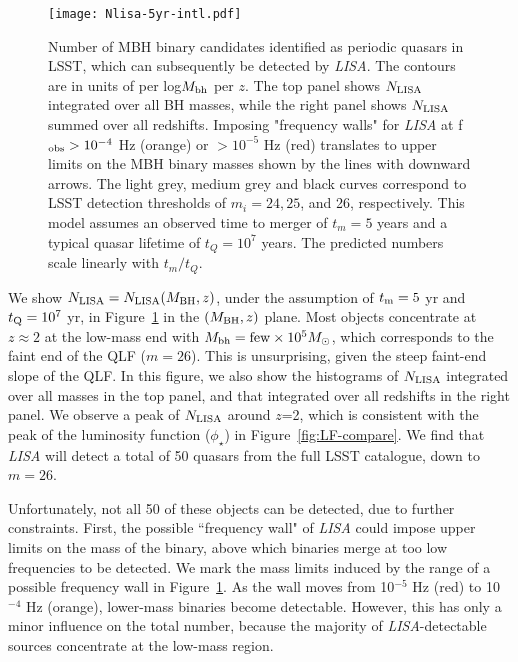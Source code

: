 \documentclass[fleqn,usenatbib]{mnras}
\begin{document}
\begin{figure}
    \centering
    \texttt{[image: Nlisa-5yr-intl.pdf]}
    \caption{Number of MBH binary candidates identified as periodic quasars in LSST, which can subsequently be detected by {\it LISA}.  The contours are in units of per log$M_{\rm bh}$ per $z$.
    The top panel shows $N_{\rm LISA}$ integrated over all BH masses,   
    while the right panel shows $N_{\rm LISA}$ summed over all redshifts.
    Imposing "frequency walls" for {\it LISA} at f$_{\rm obs}>10^{-4}$ Hz (orange) or $>10^{-5}$ Hz (red) translates to upper limits on the MBH binary masses shown by the lines with downward arrows. The light grey, medium grey and black curves correspond to LSST detection thresholds of $m_i=24, 25$, and 26, respectively.
     This model assumes an observed time to merger of $t_m=5$ years and a typical quasar lifetime of $t_Q=10^7$ years. The predicted numbers scale linearly with $t_m/t_Q$.}
    \label{fig:Norb_5yr}
\end{figure}

We show $N_{\rm LISA}=N_{\rm LISA}(M_{\rm BH},z)$, 
under the assumption of $t_{\rm m}=5$ yr and $t_{\rm Q}=10^7$ yr, 
in Figure~\ref{fig:Norb_5yr} in the $(M_{\rm BH},z)$ plane.
Most objects concentrate at $z\approx 2$ at the low-mass end with $M_{\rm bh}={\rm few} \times 10^5 M_{\odot}$, which corresponds to the faint end of the QLF ($m=26$). This is unsurprising, given the steep faint-end slope of the QLF. In this figure, we also show the histograms of $N_{\rm LISA}$ integrated over all masses in the top panel, and that integrated over all redshifts in the right panel.  We observe a peak of $N_{\rm LISA}$ around $z$=2, which is consistent with the peak of the luminosity function
($\phi_{\star}$) in Figure~\ref{fig:LF-compare}. We find that {\it LISA} will detect a total of 50 quasars from the full LSST catalogue, down to $m=26$.
 
Unfortunately, not all 50 of these objects can be detected, due to further constraints. First, the possible ``frequency wall" of {\it LISA} could impose upper limits on the mass of the binary, above which binaries merge at too low frequencies to be detected.
We mark the mass limits induced by the range of a possible frequency wall in Figure~\ref{fig:Norb_5yr}. As the wall moves from 10$^{-5}$ Hz (red) to 10$^{-4}$ Hz (orange), lower-mass binaries become detectable. However, this has only a minor influence on the total number, because the majority of {\it LISA}-detectable sources concentrate at the low-mass region.
\end{document}
